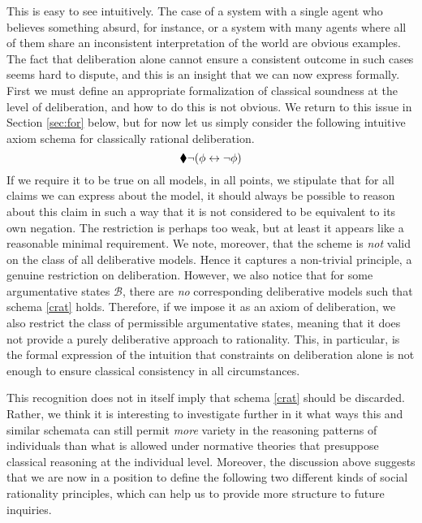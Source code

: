 \documentclass[greybox]{svmult}
\newcommand{\views}{\mathcal B}
\begin{document}
This is easy to see intuitively. The case of a system with a single agent who believes something absurd, for instance, or a system with many agents where all of them share an inconsistent interpretation of the world are obvious examples. The fact that deliberation alone cannot ensure a consistent outcome in such cases seems hard to dispute, and this is an insight that we can now express formally. First we must define an appropriate formalization of classical soundness at the level of deliberation, and how to do this is not obvious. We return to this issue in Section \ref{sec:for} below, but for now let us simply consider the following intuitive axiom schema for classically rational deliberation.
\begin{equation}\label{crat}
\cdia \neg (\phi \leftrightarrow \neg \phi)
\end{equation}
If we require it to be true on all models, in all points, we stipulate that for all claims we can express about the model, it should always be possible to reason about this claim in such a way that it is not considered to be equivalent to its own negation. The restriction is perhaps too weak, but at least it appears like a reasonable minimal requirement. We note, moreover, that the scheme is \emph{not} valid on the class of all deliberative models. Hence it captures a non-trivial principle, a genuine restriction on deliberation. However, we also notice that for some argumentative states $\views$, there are \emph{no} corresponding deliberative models such that schema \ref{crat} holds. Therefore, if we impose it as an axiom of deliberation, we also restrict the class of permissible argumentative states, meaning that it does not provide a purely deliberative approach to rationality. This, in particular, is the formal expression of the intuition that constraints on deliberation alone is not enough to ensure classical consistency in all circumstances.

This recognition does not in itself imply that schema \ref{crat} should be discarded. Rather, we think it is interesting to investigate further in it what ways this and similar schemata can still permit \emph{more} variety in the reasoning patterns of individuals than what is allowed under normative theories that presuppose classical reasoning at the individual level. Moreover, the discussion above suggests that we are now in a position to define the following two different kinds of social rationality principles, which can help us to provide more structure to future inquiries.
\end{document}
